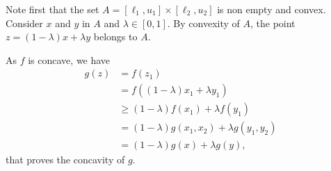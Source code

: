 
Note first that the set $A=[\ell_1,u_1] \times [\ell_2,u_2]$ is non
empty and convex.
Consider $x$ and $y$ in $A$ and $\lambda \in [0,1]$. By convexity of
$A$, the point $z= (1-\lambda)x + \lambda y$ belongs to $A$.

As $f$ is concave, we have
\begin{align*}
  g(z) & = f( z_1)\\
  &  = f((1-\lambda)x_1 + \lambda y_1)\\
  & \geq (1-\lambda) f(x_1) + \lambda f(y_1) \\
  & = (1-\lambda) g(x_1,x_2) + \lambda g(y_1,y_2) \\
  & = (1-\lambda) g(x) + \lambda g(y),
\end{align*}
that proves the concavity of $g$.


